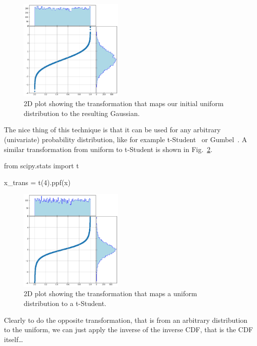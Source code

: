 \begin{figure}[htbp]
  \centering
  \includegraphics[width=0.45\textwidth]{figures/uniform_to_gauss}
  \caption{2D plot showing the transformation that maps our initial uniform distribution to the resulting Gaussian.}
  \label{fig:uniform_to_gauss}
\end{figure}
    
The nice thing of this technique is that it can be used for any arbitrary (univariate) probability distribution, like for example t-Student~\cite{bib:t_student} or Gumbel~\cite{bib:gumbel}. A similar transformation from uniform to t-Student is shown in Fig.~\ref{fig:uniform_to_tstudent}.

\begin{ipython}
from scipy.stats import t

x_trans = t(4).ppf(x)
\end{ipython}

\begin{figure}[htbp]
  \centering
  \includegraphics[width=0.45\textwidth]{figures/tstudent_to_uniform}
  \caption{2D plot showing the transformation that maps a uniform distribution to a t-Student.}
  \label{fig:uniform_to_tstudent}
\end{figure}

Clearly to do the opposite transformation, that is from an arbitrary distribution to the uniform, we can just apply the inverse of the inverse CDF, that is the CDF itself\ldots

